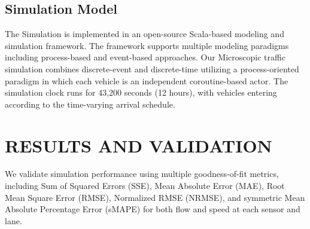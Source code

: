 \documentclass{scspaperproc}
\theoremstyle{scsthe}
\begin{document}
 \subsection{Simulation Model}
The Simulation is implemented in an open-source Scala-based modeling and simulation framework. The framework supports multiple modeling paradigms including process-based and event-based approaches. Our Microscopic traffic simulation combines discrete-event and discrete-time utilizing a process-oriented paradigm in which each vehicle is an independent coroutine-based actor.
The simulation clock runs for 43,200 seconds (12 hours), with vehicles entering according to the time-varying arrival schedule.


\section{RESULTS AND VALIDATION}
\label{sec:results}
We validate simulation performance using multiple goodness-of-fit metrics, including Sum of Squared Errors (SSE), Mean Absolute Error (MAE), Root Mean Square Error (RMSE), Normalized RMSE (NRMSE), and symmetric Mean Absolute Percentage Error (sMAPE) for both flow and speed at each sensor and lane. 
\end{document}
